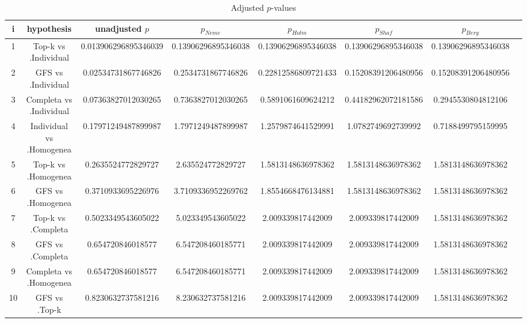 \documentclass[a4paper,10pt]{article}
\begin{document}
\begin{landscape}
\begin{table}[!htp]
\centering\tiny
\caption{Adjusted $p$-values}
\begin{tabular}{cccccccc}
i&hypothesis&unadjusted $p$&$p_{Neme}$&$p_{Holm}$&$p_{Shaf}$&$p_{Berg}$\\
\hline
1&Top-k vs .Individual&0.013906296895346039&0.13906296895346038&0.13906296895346038&0.13906296895346038&0.13906296895346038\\
2&GFS vs .Individual&0.02534731867746826&0.2534731867746826&0.22812586809721433&0.15208391206480956&0.15208391206480956\\
3&Completa vs .Individual&0.07363827012030265&0.7363827012030265&0.5891061609624212&0.44182962072181586&0.2945530804812106\\
4&Individual vs .Homogenea&0.17971249487899987&1.7971249487899987&1.2579874641529991&1.0782749692739992&0.7188499795159995\\
5&Top-k vs .Homogenea&0.2635524772829727&2.635524772829727&1.5813148636978362&1.5813148636978362&1.5813148636978362\\
6&GFS vs .Homogenea&0.3710933695226976&3.7109336952269762&1.8554668476134881&1.5813148636978362&1.5813148636978362\\
7&Top-k vs .Completa&0.5023349543605022&5.023349543605022&2.009339817442009&2.009339817442009&1.5813148636978362\\
8&GFS vs .Completa&0.654720846018577&6.547208460185771&2.009339817442009&2.009339817442009&1.5813148636978362\\
9&Completa vs .Homogenea&0.654720846018577&6.547208460185771&2.009339817442009&2.009339817442009&1.5813148636978362\\
10&GFS vs .Top-k&0.8230632737581216&8.230632737581216&2.009339817442009&2.009339817442009&1.5813148636978362\\
\hline
\end{tabular}
\end{table}

\end{landscape}
\end{document}
